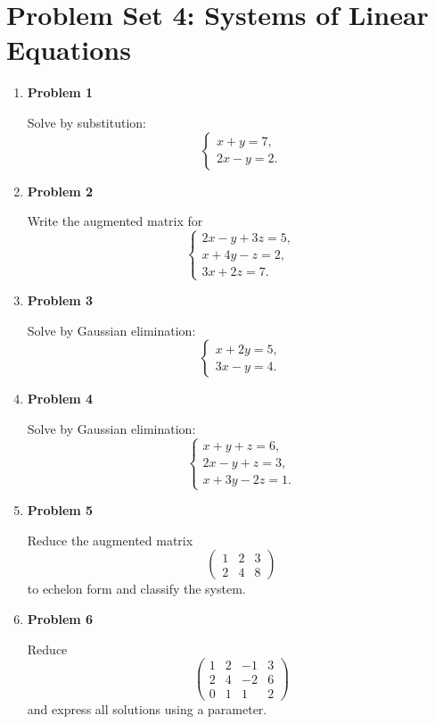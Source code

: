 \section{Problem Set 4: Systems of Linear Equations}

\begin{enumerate}
\item \textbf{Problem 1}\par
Solve by substitution:
\[
\begin{cases}
x+y=7,\\
2x-y=2.
\end{cases}
\]

\item \textbf{Problem 2}\par
Write the augmented matrix for
\[
\begin{cases}
2x-y+3z=5,\\
x+4y-z=2,\\
3x+2z=7.
\end{cases}
\]

\item \textbf{Problem 3}\par
Solve by Gaussian elimination:
\[
\begin{cases}
x+2y=5,\\
3x-y=4.
\end{cases}
\]

\item \textbf{Problem 4}\par
Solve by Gaussian elimination:
\[
\begin{cases}
x+y+z=6,\\
2x-y+z=3,\\
x+3y-2z=1.
\end{cases}
\]

\item \textbf{Problem 5}\par
Reduce the augmented matrix
\[
\left(
\begin{array}{cc|c}
1&2&3\\
2&4&8
\end{array}
\right)
\]
to echelon form and classify the system.

\item \textbf{Problem 6}\par
Reduce
\[
\left(
\begin{array}{ccc|c}
1&2&-1&3\\
2&4&-2&6\\
0&1&1&2
\end{array}
\right)
\]
and express all solutions using a parameter.


\end{enumerate}
